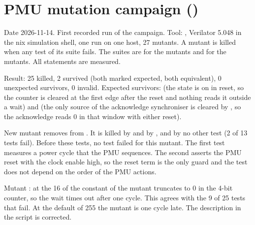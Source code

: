 \section{PMU mutation campaign ()}\label{cr:defect:pmu-mutation-campaign}

\begin{record}

Date 2026-11-14. First recorded run of the campaign. Tool: , Verilator 5.048 in the nix simulation shell, one run on one host, 27 mutants. A mutant is killed when any test of its suite fails. The suites are  for the  mutants and  for the  mutants. All statements are measured.

\end{record}

\begin{record}

Result: 25 killed, 2 survived (both marked expected, both equivalent), 0 unexpected survivors, 0 invalid. Expected survivors:  (the state is on in reset, so the counter is cleared at the first edge after the reset and nothing reads it outside a wait) and  (the only source of the acknowledge synchroniser is cleared by , so the acknowledge reads 0 in that window with either reset).

\end{record}

\begin{record}

New mutant  removes  from . It is killed by  and by , and by no other test (2 of 13 tests fail). Before these tests, no test failed for this mutant. The first test measures a power cycle that the PMU sequences. The second asserts the PMU reset with the clock enable high, so the reset term is the only guard and the test does not depend on the order of the PMU actions.

\end{record}

\begin{record}

Mutant : at the 16 of  the constant of the mutant truncates to 0 in the 4-bit counter, so the wait times out after one cycle. This agrees with the 9 of 25 tests that fail. At the default of 255 the mutant is one cycle late. The description in the script is corrected.

\end{record}

